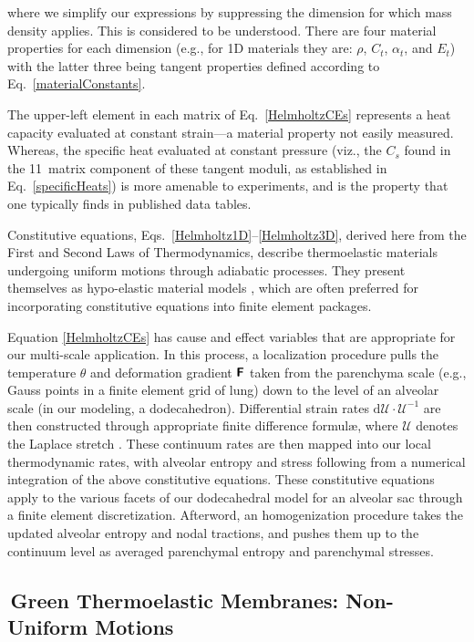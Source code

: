 where we simplify our expressions by suppressing the dimension for which mass density applies.  This is considered to be understood.  There are four material properties for each dimension (e.g., for 1D materials they are: $\rho$, $C_t$, $\alpha_t$, and $E_t$) with the latter three being tangent properties defined according to Eq.~\ref{materialConstants}.

The upper-left element in each matrix of Eq.~\ref{HelmholtzCEs} represents a heat capacity evaluated at constant strain---a material property not easily measured.  Whereas, the specific heat evaluated at constant pressure (viz., the $C_s$ found in the 11~matrix component of these tangent moduli, as established in Eq.~\ref{specificHeats}) is more amenable to experiments, and is the property that one typically finds in published data tables.  

Constitutive equations, Eqs.~\ref{Helmholtz1D}--\ref{Helmholtz3D}, derived here from the First and Second Laws of Thermo\-dynamics, describe thermo\-elastic materials undergoing uniform motions through adiabatic processes.  They present themselves as hypo-elastic material models \cite{Truesdell55}, which are often preferred for incorporating constitutive equations into finite element packages.

Equation \ref{HelmholtzCEs} has cause and effect variables that are appropriate for our multi-scale application.  In this process, a localization procedure pulls the temperature $\theta$ and deformation gradient $\boldsymbol{\mathsf{F}}$ taken from the parenchyma scale (e.g., Gauss points in a finite element grid of lung) down to the level of an alveolar scale (in our modeling, a dodecahedron).  Differential strain rates $\mathrm{d} \boldsymbol{\mathcal{U}} \cdot \boldsymbol{\mathcal{U}}^{-1}$ are then constructed through appropriate finite difference formul\ae, where $\boldsymbol{\mathcal{U}}$ denotes the Laplace stretch \cite{Freedetal19}. These continuum rates are then mapped into our local thermo\-dynamic rates, with alveolar entropy and stress following from a numerical integration of the above constitutive equations.  These constitutive equations apply to the various facets of our dodecahedral model for an alveolar sac through a finite element discretization.  Afterword, an homogenization procedure takes the updated alveolar entropy and nodal tractions, and pushes them up to the continuum level as averaged parenchymal entropy and parenchymal stresses. 

\subsection{$\,$Green Thermoelastic Membranes: Non-Uniform Motions}
\label{secNonuniform2D}


